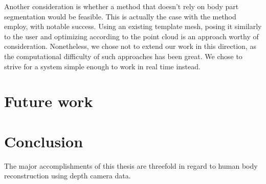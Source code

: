 Another consideration is whether a method that doesn't rely on body part segmentation would be feasible. This is actually the case with the method \citet{weiss2011home} employ, with notable success. Using an existing template mesh, posing it similarly to the user and optimizing according to the point cloud is an approach worthy of consideration. Nonetheless, we chose not to extend our work in this direction, as the computational difficulty of such approaches has been great. We chose to strive for a system simple enough to work in real time instead.


\section{Future work}


\section{Conclusion}

The major accomplishments of this thesis are threefold in regard to human body reconstruction using depth camera data.

